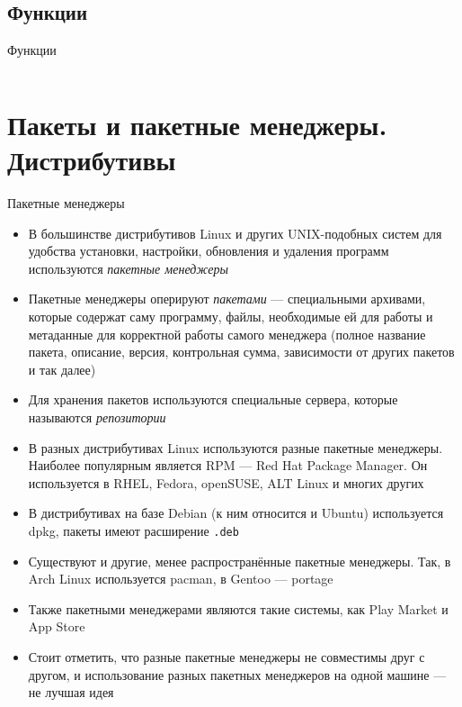 \documentclass[handout]{beamer}
\begin{document}
\subsection{Функции}
\begin{frame}{Функции}
	\inputminted[linenos,bgcolor=listing]{bash}{files/unix_quickstart/functions.sh}
\end{frame}

\section{Пакеты и пакетные менеджеры. Дистрибутивы}

\begin{frame}{Пакетные менеджеры}
	\begin{itemize}
		\item{В большинстве дистрибутивов Linux и других UNIX-подобных систем для удобства установки, настройки, обновления и удаления программ используются \emph{пакетные менеджеры}}\pause
		\item{Пакетные менеджеры оперируют \emph{пакетами} --- специальными архивами, которые содержат саму программу, файлы, необходимые ей для работы и метаданные для корректной работы самого менеджера (полное название пакета, описание, версия, контрольная сумма, зависимости от других пакетов и так далее)}\pause
		\item{Для хранения пакетов используются специальные сервера, которые называются \emph{репозитории}}
	\end{itemize}
\end{frame}

\begin{frame}
	\begin{itemize}
		\item{В разных дистрибутивах Linux используются разные пакетные менеджеры. Наиболее популярным является RPM --- Red Hat Package Manager. Он используется в RHEL, Fedora, openSUSE, ALT Linux и многих других}\pause
		\item{В дистрибутивах на базе Debian (к ним относится и Ubuntu) используется dpkg, пакеты имеют расширение \texttt{.deb}}\pause
		\item{Существуют и другие, менее распространённые пакетные менеджеры. Так, в Arch Linux используется pacman, в Gentoo --- portage}\pause
		\item{Также пакетными менеджерами являются такие системы, как Play Market и App Store}\pause
		\item{Стоит отметить, что разные пакетные менеджеры не совместимы друг с другом, и использование разных пакетных менеджеров на одной машине --- не лучшая идея}
	\end{itemize}
\end{frame}
\end{document}
